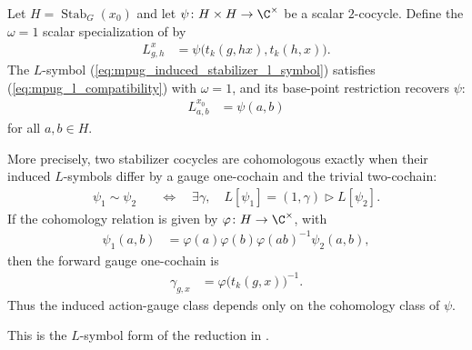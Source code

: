 \begin{lemma}
    \label{thm:mpug_stabilizer_cocycle_l_symbol}
    \leanok
    Let $H=\operatorname{Stab}_G(x_0)$ and let
    $\psi\colon H\times H\to\C^\times$ be a scalar $2$-cocycle. Define the
    $\omega=1$ scalar specialization of \cite[Eq.~(20)]{GarreRubio2023MPOSym}
    by
    \begin{align}
        L^x_{g,h}
         & =\psi\bigl(t_k(g,hx),t_k(h,x)\bigr).
        \label{eq:mpug_induced_stabilizer_l_symbol}
    \end{align}
    The $L$-symbol (\ref{eq:mpug_induced_stabilizer_l_symbol}) satisfies
    (\ref{eq:mpug_l_compatibility}) with $\omega=1$, and its base-point
    restriction recovers $\psi$:
    \begin{align}
        L^{x_0}_{a,b} & =\psi(a,b)
        \label{eq:mpug_induced_stabilizer_base}
    \end{align}
    for all $a,b\in H$.

    More precisely, two stabilizer cocycles are cohomologous exactly when
    their induced $L$-symbols differ by a gauge one-cochain and the trivial
    two-cochain:
    \begin{align}
        \psi_1\sim\psi_2
         & \quad\Longleftrightarrow\quad
        \exists\gamma,\quad
        L[\psi_1]=(1,\gamma)\mathbin{\triangleright}L[\psi_2].
        \label{eq:mpug_induced_cohomology_iff}
    \end{align}
    If the cohomology relation is given by
    $\varphi\colon H\to\C^\times$, with
    \begin{align}
        \psi_1(a,b)
         & =\varphi(a)\varphi(b)\varphi(ab)^{-1}\psi_2(a,b),
        \label{eq:mpug_stabilizer_cocycle_gauge}
    \end{align}
    then the forward gauge one-cochain is
    \begin{align}
        \gamma_{g,x} & =\varphi\bigl(t_k(g,x)\bigr)^{-1}.
        \label{eq:mpug_induced_action_gauge}
    \end{align}
    Thus the induced action-gauge class depends only on the cohomology class
    of $\psi$.

    This is the $L$-symbol form of the reduction in
    \cite[lines~7028--7042]{FrancoRubio2025MPUGauging}.
\end{lemma}

